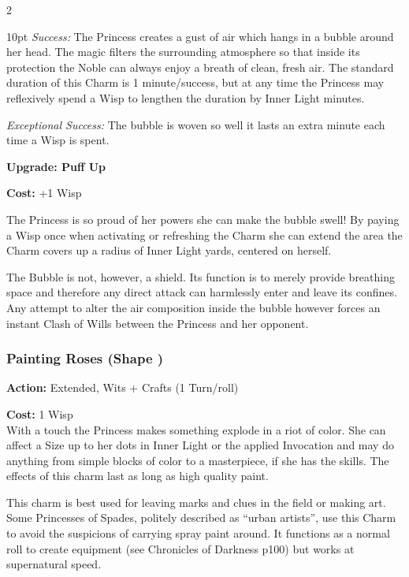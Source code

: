 \begin{multicols}{2}
\begin{myindentpar}{10pt}
\emph{Success:} The Princess creates a gust of air which hangs in a bubble around her head. The magic filters the surrounding atmosphere so that inside its protection the Noble can always enjoy a breath of clean, fresh air. The standard duration of this Charm is 1 minute/success, but at any time the Princess may reflexively spend a Wisp to lengthen the duration by Inner Light minutes.

\emph{Exceptional Success:} The bubble is woven so well it lasts an extra minute each time a Wisp is spent.

\textbf{Upgrade: Puff Up}

\noindent \textbf{Cost:} +1 Wisp

The Princess is so proud of her powers she can make the bubble swell! By paying a Wisp once when activating or refreshing the Charm she can extend the area the Charm covers up a radius of Inner Light yards, centered on herself.

The Bubble is not, however, a shield. Its function is to merely provide breathing space and therefore any direct attack can harmlessly enter and leave its confines. Any attempt to alter the air composition inside the bubble however forces an instant Clash of Wills between the Princess and her opponent.\end{myindentpar}


\subsubsection*{Painting Roses (Shape \textbullet)}

\noindent \textbf{Action:} Extended, Wits + Crafts (1 Turn/roll)

\noindent \textbf{Cost:} 1 Wisp \\

\noindent With a touch the Princess makes something explode in a riot of color. She can affect a Size up to her dots in Inner Light or the applied Invocation and may do anything from simple blocks of color to a masterpiece, if she has the skills. The effects of this charm last as long as high quality paint.

This charm is best used for leaving marks and clues in the field or making art. Some Princesses of Spades, politely described as \textquotedblleft urban artists\textquotedblright , use this Charm to avoid the suspicions of carrying spray paint around. It functions as a normal roll to create equipment (see Chronicles of Darkness p100) but works at supernatural speed.


\end{multicols}
